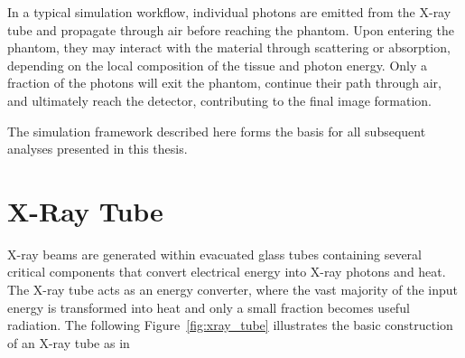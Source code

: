 In a typical simulation workflow, individual photons are emitted from the X-ray
tube and propagate through air before reaching the phantom. Upon entering the
phantom, they may interact with the material through scattering or absorption,
depending on the local composition of the tissue and photon energy. Only a
fraction of the photons will exit the phantom, continue their path through air,
and ultimately reach the detector, contributing to the final image formation.

The simulation framework described here forms the basis for all subsequent
analyses presented in this thesis.


\section{X-Ray Tube}

X-ray beams are generated within evacuated glass tubes containing several
critical components that convert electrical energy into X-ray photons and heat.
The X-ray tube acts as an energy converter, where the vast majority of the input
energy is transformed into heat and only a small fraction becomes useful
radiation. The following Figure~\ref{fig:xray_tube} illustrates the basic
construction of an X-ray tube as in \cite{poludniowski2022calculating}

